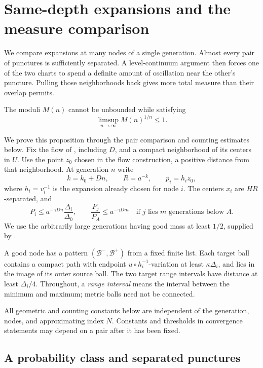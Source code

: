 \section{Same-depth expansions and the measure comparison}
\label{sec:pairs}

We compare expansions at many nodes of a single generation. Almost
every pair of punctures is sufficiently separated. A level-continuum
argument then forces one of the two charts to spend a definite amount
of oscillation near the other's puncture. Pulling those neighborhoods
back gives more total measure than their overlap permits.

\begin{proposition}
\label{prop:no-subexponential-records}
The moduli $M(n)$ cannot be unbounded while satisfying
\[
 \limsup_{n\to\infty}M(n)^{1/n}\leq1.
\]
\end{proposition}

We prove this proposition through the pair comparison and counting
estimates below. Fix the flow of , including $D$, and a
compact neighborhood of its centers in $U$. Use the point $z_0$ chosen
in the flow construction, a positive distance from that neighborhood.
At generation $n$ write
\[
 k=k_0+Dn,\qquad R=a^{-k},\qquad p_i=h_i z_0,
\]
where $h_i=v_i^{-1}$ is the expansion already chosen for node $i$.
The centers $x_i$ are $HR$-separated, and
\begin{equation}
 P_i\le a^{-\gamma Dn}\frac{\Delta_i}{\Delta_0},
 \qquad \frac{P_j}{P_A}\le a^{-\gamma Dm}
 \quad\text{if $j$ lies $m$ generations below $A$}.
 \label{eq:pairs-flow-input}
\end{equation}
We use the arbitrarily large generations having good mass at least
$1/2$, supplied by .

A good node has a pattern $(\mathcal B^-,\mathcal B^+)$ from a fixed
finite list. Each target ball contains a compact path with endpoint
$u\circ h_i^{-1}$-variation at least $\kappa\Delta_i$, and lies in
the image of its outer source ball. The two target range intervals
have distance at least $\Delta_i/4$. Throughout, a \emph{range interval}
means the interval between the minimum and maximum; metric balls need
not be connected.

All geometric and counting constants below are independent of the
generation, nodes, and approximating index $N$. Constants and thresholds
in convergence statements may depend on a pair after it has been fixed.

\subsection{A probability class and separated punctures}

